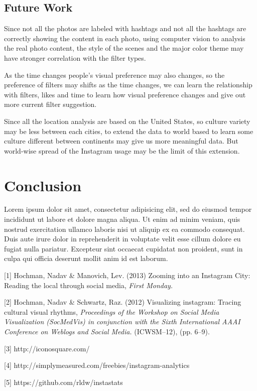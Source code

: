 \documentclass[conference]{acmsiggraph}
\begin{document}
\subsection{Future Work}
Since not all the photos are labeled with hashtags and not all the hashtags are correctly showing the content in each photo, using computer vision to analysis the real photo content, the style of the scenes and the major color theme may have stronger correlation with the filter types.

As the time changes people's visual preference may also changes, so the preference of filters may shifts as the time changes, we can learn the relationship with filters, likes and time to learn how visual preference changes and give out more current filter suggestion.

Since all the location analysis are based on the United States, so culture variety may be less between each cities, to extend the data to world based to learn some culture different between continents may give us more meaningful data. But world-wise spread of the Instagram usage may be the limit of this extension.

\section{Conclusion}

Lorem ipsum dolor sit amet, consectetur adipisicing elit, sed do
eiusmod tempor incididunt ut labore et dolore magna aliqua. Ut enim ad
minim veniam, quis nostrud exercitation ullamco laboris nisi ut
aliquip ex ea commodo consequat. Duis aute irure dolor in
reprehenderit in voluptate velit esse cillum dolore eu fugiat nulla
pariatur. Excepteur sint occaecat cupidatat non proident, sunt in
culpa qui officia deserunt mollit anim id est laborum.


\begin{thebibliography}{10}




  [1] Hochman, Nadav \& Manovich, Lev. (2013) Zooming into an Instagram City: Reading the local through social media,
  \emph{ First Monday.}
  
  [2] Hochman, Nadav \& Schwartz, Raz. (2012) Visualizing instagram: Tracing cultural visual rhythms,
  \emph{Proceedings of the Workshop on Social Media Visualization (SocMedVis) in conjunction with the Sixth International AAAI Conference on Weblogs and Social Media.}
  (ICWSM--12), (pp. 6--9).
  
  [3] http://iconosquare.com/
  
  [4] http://simplymeasured.com/freebies/instagram-analytics
  
  [5] https://github.com/rldw/instastats
  
\end{thebibliography}
\end{document}
